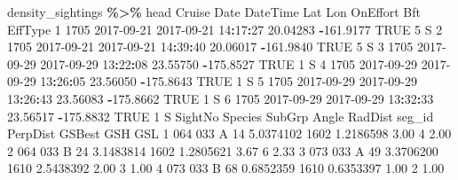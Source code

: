 \documentclass[
]{book}
\newenvironment{Shaded}{\begin{snugshade}}{\end{snugshade}}
\newcommand{\ConstantTok}[1]{\textcolor[rgb]{0.56,0.35,0.01}{#1}}
\newcommand{\DecValTok}[1]{\textcolor[rgb]{0.00,0.00,0.81}{#1}}
\newcommand{\FloatTok}[1]{\textcolor[rgb]{0.00,0.00,0.81}{#1}}
\newcommand{\NormalTok}[1]{#1}
\newcommand{\SpecialCharTok}[1]{\textcolor[rgb]{0.81,0.36,0.00}{\textbf{#1}}}
\begin{document}
\begin{Shaded}
\begin{Highlighting}[]
\NormalTok{density\_sightings }\SpecialCharTok{\%\textgreater{}\%}\NormalTok{ head}
\NormalTok{  Cruise       Date            DateTime      Lat       Lon OnEffort Bft EffType}
\DecValTok{1}   \DecValTok{1705} \DecValTok{2017{-}09{-}21} \DecValTok{2017{-}09{-}21} \DecValTok{14}\SpecialCharTok{:}\DecValTok{17}\SpecialCharTok{:}\DecValTok{27} \FloatTok{20.04283} \SpecialCharTok{{-}}\FloatTok{161.9177}     \ConstantTok{TRUE}   \DecValTok{5}\NormalTok{       S}
\DecValTok{2}   \DecValTok{1705} \DecValTok{2017{-}09{-}21} \DecValTok{2017{-}09{-}21} \DecValTok{14}\SpecialCharTok{:}\DecValTok{39}\SpecialCharTok{:}\DecValTok{40} \FloatTok{20.06017} \SpecialCharTok{{-}}\FloatTok{161.9840}     \ConstantTok{TRUE}   \DecValTok{5}\NormalTok{       S}
\DecValTok{3}   \DecValTok{1705} \DecValTok{2017{-}09{-}29} \DecValTok{2017{-}09{-}29} \DecValTok{13}\SpecialCharTok{:}\DecValTok{22}\SpecialCharTok{:}\DecValTok{08} \FloatTok{23.55750} \SpecialCharTok{{-}}\FloatTok{175.8527}     \ConstantTok{TRUE}   \DecValTok{1}\NormalTok{       S}
\DecValTok{4}   \DecValTok{1705} \DecValTok{2017{-}09{-}29} \DecValTok{2017{-}09{-}29} \DecValTok{13}\SpecialCharTok{:}\DecValTok{26}\SpecialCharTok{:}\DecValTok{05} \FloatTok{23.56050} \SpecialCharTok{{-}}\FloatTok{175.8643}     \ConstantTok{TRUE}   \DecValTok{1}\NormalTok{       S}
\DecValTok{5}   \DecValTok{1705} \DecValTok{2017{-}09{-}29} \DecValTok{2017{-}09{-}29} \DecValTok{13}\SpecialCharTok{:}\DecValTok{26}\SpecialCharTok{:}\DecValTok{43} \FloatTok{23.56083} \SpecialCharTok{{-}}\FloatTok{175.8662}     \ConstantTok{TRUE}   \DecValTok{1}\NormalTok{       S}
\DecValTok{6}   \DecValTok{1705} \DecValTok{2017{-}09{-}29} \DecValTok{2017{-}09{-}29} \DecValTok{13}\SpecialCharTok{:}\DecValTok{32}\SpecialCharTok{:}\DecValTok{33} \FloatTok{23.56517} \SpecialCharTok{{-}}\FloatTok{175.8832}     \ConstantTok{TRUE}   \DecValTok{1}\NormalTok{       S}
\NormalTok{  SightNo Species SubGrp Angle   RadDist seg\_id  PerpDist GSBest GSH  GSL}
\DecValTok{1}     \DecValTok{064}     \DecValTok{033}\NormalTok{      A    }\DecValTok{14} \FloatTok{5.0374102}   \DecValTok{1602} \FloatTok{1.2186598}   \FloatTok{3.00}   \DecValTok{4} \FloatTok{2.00}
\DecValTok{2}     \DecValTok{064}     \DecValTok{033}\NormalTok{      B    }\DecValTok{24} \FloatTok{3.1483814}   \DecValTok{1602} \FloatTok{1.2805621}   \FloatTok{3.67}   \DecValTok{6} \FloatTok{2.33}
\DecValTok{3}     \DecValTok{073}     \DecValTok{033}\NormalTok{      A    }\DecValTok{49} \FloatTok{3.3706200}   \DecValTok{1610} \FloatTok{2.5438392}   \FloatTok{2.00}   \DecValTok{3} \FloatTok{1.00}
\DecValTok{4}     \DecValTok{073}     \DecValTok{033}\NormalTok{      B    }\DecValTok{68} \FloatTok{0.6852359}   \DecValTok{1610} \FloatTok{0.6353397}   \FloatTok{1.00}   \DecValTok{2} \FloatTok{1.00}

\end{Highlighting}
\end{Shaded}
\end{document}

